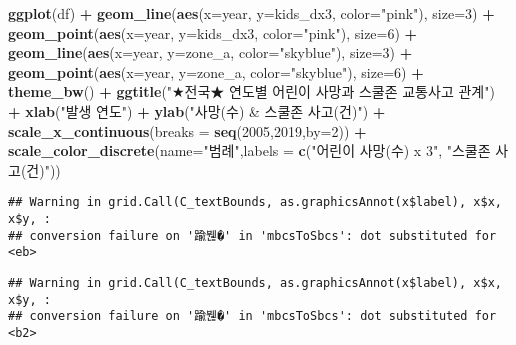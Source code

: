 \documentclass[
]{article}
\newenvironment{Shaded}{\begin{snugshade}}{\end{snugshade}}
\newcommand{\DataTypeTok}[1]{\textcolor[rgb]{0.13,0.29,0.53}{#1}}
\newcommand{\DecValTok}[1]{\textcolor[rgb]{0.00,0.00,0.81}{#1}}
\newcommand{\KeywordTok}[1]{\textcolor[rgb]{0.13,0.29,0.53}{\textbf{#1}}}
\newcommand{\NormalTok}[1]{#1}
\newcommand{\OperatorTok}[1]{\textcolor[rgb]{0.81,0.36,0.00}{\textbf{#1}}}
\newcommand{\StringTok}[1]{\textcolor[rgb]{0.31,0.60,0.02}{#1}}
\begin{document}
\begin{Shaded}
\begin{Highlighting}[]
\KeywordTok{ggplot}\NormalTok{(df) }\OperatorTok{+}\StringTok{ }
\StringTok{  }\KeywordTok{geom_line}\NormalTok{(}\KeywordTok{aes}\NormalTok{(}\DataTypeTok{x=}\NormalTok{year, }\DataTypeTok{y=}\NormalTok{kids_dx3, }\DataTypeTok{color=}\StringTok{"pink"}\NormalTok{), }\DataTypeTok{size=}\DecValTok{3}\NormalTok{) }\OperatorTok{+}
\StringTok{  }\KeywordTok{geom_point}\NormalTok{(}\KeywordTok{aes}\NormalTok{(}\DataTypeTok{x=}\NormalTok{year, }\DataTypeTok{y=}\NormalTok{kids_dx3, }\DataTypeTok{color=}\StringTok{"pink"}\NormalTok{), }\DataTypeTok{size=}\DecValTok{6}\NormalTok{) }\OperatorTok{+}
\StringTok{  }\KeywordTok{geom_line}\NormalTok{(}\KeywordTok{aes}\NormalTok{(}\DataTypeTok{x=}\NormalTok{year, }\DataTypeTok{y=}\NormalTok{zone_a, }\DataTypeTok{color=}\StringTok{"skyblue"}\NormalTok{), }\DataTypeTok{size=}\DecValTok{3}\NormalTok{) }\OperatorTok{+}
\StringTok{  }\KeywordTok{geom_point}\NormalTok{(}\KeywordTok{aes}\NormalTok{(}\DataTypeTok{x=}\NormalTok{year, }\DataTypeTok{y=}\NormalTok{zone_a, }\DataTypeTok{color=}\StringTok{"skyblue"}\NormalTok{), }\DataTypeTok{size=}\DecValTok{6}\NormalTok{) }\OperatorTok{+}
\StringTok{  }\KeywordTok{theme_bw}\NormalTok{() }\OperatorTok{+}
\StringTok{  }\KeywordTok{ggtitle}\NormalTok{(}\StringTok{"★전국★ 연도별 어린이 사망과 스쿨존 교통사고 관계"}\NormalTok{) }\OperatorTok{+}
\StringTok{  }\KeywordTok{xlab}\NormalTok{(}\StringTok{"발생 연도"}\NormalTok{) }\OperatorTok{+}\StringTok{ }\KeywordTok{ylab}\NormalTok{(}\StringTok{"사망(수) & 스쿨존 사고(건)"}\NormalTok{) }\OperatorTok{+}
\StringTok{  }\KeywordTok{scale_x_continuous}\NormalTok{(}\DataTypeTok{breaks =} \KeywordTok{seq}\NormalTok{(}\DecValTok{2005}\NormalTok{,}\DecValTok{2019}\NormalTok{,}\DataTypeTok{by=}\DecValTok{2}\NormalTok{)) }\OperatorTok{+}
\StringTok{  }\KeywordTok{scale_color_discrete}\NormalTok{(}\DataTypeTok{name=}\StringTok{"범례"}\NormalTok{,}\DataTypeTok{labels =} \KeywordTok{c}\NormalTok{(}\StringTok{"어린이 사망(수) x 3"}\NormalTok{, }\StringTok{"스쿨존 사고(건)"}\NormalTok{))}
\end{Highlighting}
\end{Shaded}

\begin{verbatim}
## Warning in grid.Call(C_textBounds, as.graphicsAnnot(x$label), x$x, x$y, :
## conversion failure on '踰붾�' in 'mbcsToSbcs': dot substituted for <eb>
\end{verbatim}

\begin{verbatim}
## Warning in grid.Call(C_textBounds, as.graphicsAnnot(x$label), x$x, x$y, :
## conversion failure on '踰붾�' in 'mbcsToSbcs': dot substituted for <b2>
\end{verbatim}
\end{document}
